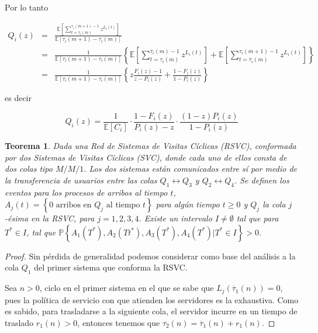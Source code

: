 \documentclass{article}
\newtheorem{Teo}{Teorema}[section]
\newcommand{\esp}{\mathbb{E}}
\newcommand{\prob}{\mathbb{P}}
\numberwithin{equation}{section}
\begin{document}
{Por lo tanto

\begin{eqnarray*}
Q_{i}\left(z\right)&=&\frac{\esp\left[\sum_{t=\tau_{i}\left(m\right)}^{\tau_{i}
\left(m+1\right)-1}z^{L_{i}\left(t\right)}\right]}{\esp\left[\tau_{i}\left(m+1\right)-\tau_{i}\left(m\right)\right]}\\
&=&\frac{1}{\esp\left[\tau_{i}\left(m+1\right)-\tau_{i}\left(m\right)\right]}
\left\{
\esp\left[\sum_{t=\tau_{i}\left(m\right)}^{\overline{\tau}_{i}\left(m\right)-1}
z^{L_{i}\left(t\right)}\right]
+\esp\left[\sum_{t=\overline{\tau}_{i}\left(m\right)}^{\tau_{i}\left(m+1\right)-1}
z^{L_{i}\left(t\right)}\right]\right\}\\
&=&\frac{1}{\esp\left[\tau_{i}\left(m+1\right)-\tau_{i}\left(m\right)\right]}
\left\{
z\frac{F_{i}\left(z\right)-1}{z-P_{i}\left(z\right)}+\frac{1-F_{i}\left(z\right)}
{1-P_{i}\left(z\right)}
\right\}
\end{eqnarray*}

es decir

\begin{equation}
Q_{i}\left(z\right)=\frac{1}{\esp\left[C_{i}\right]}\cdot\frac{1-F_{i}\left(z\right)}{P_{i}\left(z\right)-z}\cdot\frac{\left(1-z\right)P_{i}\left(z\right)}{1-P_{i}\left(z\right)}
\end{equation}

\begin{Teo}
Dada una Red de Sistemas de Visitas C\'iclicas (RSVC), conformada por dos Sistemas de Visitas C\'iclicas (SVC), donde cada uno de ellos consta de dos colas tipo $M/M/1$. Los dos sistemas est\'an comunicados entre s\'i por medio de la transferencia de usuarios entre las colas $Q_{1}\leftrightarrow Q_{3}$ y $Q_{2}\leftrightarrow Q_{4}$. Se definen los eventos para los procesos de arribos al tiempo $t$, $A_{j}\left(t\right)=\left\{0 \textrm{ arribos en }Q_{j}\textrm{ al tiempo }t\right\}$ para alg\'un tiempo $t\geq0$ y $Q_{j}$ la cola $j$-\'esima en la RSVC, para $j=1,2,3,4$.  Existe un intervalo $I\neq\emptyset$ tal que para $T^{*}\in I$, tal que $\prob\left\{A_{1}\left(T^{*}\right),A_{2}\left(Tt^{*}\right),
A_{3}\left(T^{*}\right),A_{4}\left(T^{*}\right)|T^{*}\in I\right\}>0$.
\end{Teo}

\begin{proof}
Sin p\'erdida de generalidad podemos considerar como base del an\'alisis a la cola $Q_{1}$ del primer sistema que conforma la RSVC.

Sea $n>0$, ciclo en el primer sistema en el que se sabe que $L_{j}\left(\overline{\tau}_{1}\left(n\right)\right)=0$, pues la pol\'itica de servicio con que atienden los servidores es la exhaustiva. Como es sabido, para trasladarse a la siguiente cola, el servidor incurre en un tiempo de traslado $r_{1}\left(n\right)>0$, entonces tenemos que $\tau_{2}\left(n\right)=\overline{\tau}_{1}\left(n\right)+r_{1}\left(n\right)$.



\end{proof}}
\end{document}
